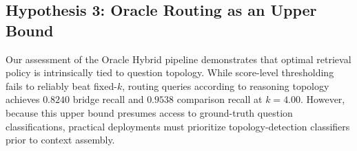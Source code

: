 \documentclass[conference]{IEEEtran}
\begin{document}
\subsection{Hypothesis 3: Oracle Routing as an Upper Bound}
Our assessment of the Oracle Hybrid pipeline demonstrates that optimal retrieval policy is intrinsically tied to question topology. While score-level thresholding fails to reliably beat fixed-$k$, routing queries according to reasoning topology achieves $0.8240$ bridge recall and $0.9538$ comparison recall at $k=4.00$. However, because this upper bound presumes access to ground-truth question classifications, practical deployments must prioritize topology-detection classifiers prior to context assembly.

\end{document}
